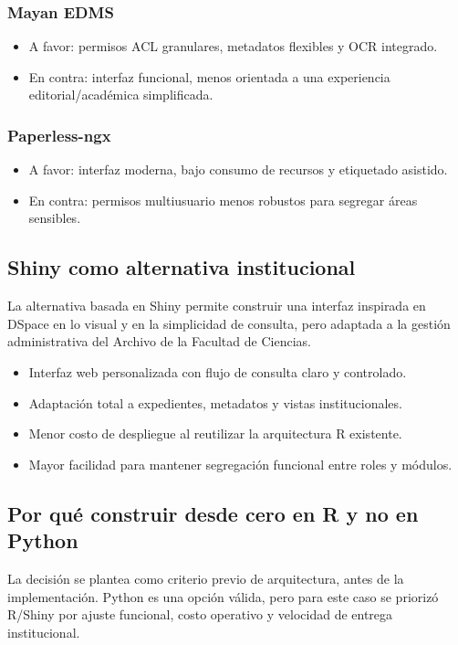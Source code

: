 \subsubsection{Mayan EDMS}
\begin{itemize}
  \item A favor: permisos ACL granulares, metadatos flexibles y OCR integrado.
  \item En contra: interfaz funcional, menos orientada a una experiencia editorial/académica simplificada.
\end{itemize}

\subsubsection{Paperless-ngx}
\begin{itemize}
  \item A favor: interfaz moderna, bajo consumo de recursos y etiquetado asistido.
  \item En contra: permisos multiusuario menos robustos para segregar áreas sensibles.
\end{itemize}

\subsection{Shiny como alternativa institucional}
La alternativa basada en Shiny permite construir una interfaz inspirada en DSpace en lo visual y en la simplicidad de consulta, pero adaptada a la gestión administrativa del Archivo de la Facultad de Ciencias.

\begin{itemize}
  \item Interfaz web personalizada con flujo de consulta claro y controlado.
  \item Adaptación total a expedientes, metadatos y vistas institucionales.
  \item Menor costo de despliegue al reutilizar la arquitectura R existente.
  \item Mayor facilidad para mantener segregación funcional entre roles y módulos.
\end{itemize}

\subsection{Por qué construir desde cero en R y no en Python}
La decisión se plantea como criterio previo de arquitectura, antes de la implementación. Python es una opción válida, pero para este caso se priorizó R/Shiny por ajuste funcional, costo operativo y velocidad de entrega institucional.

